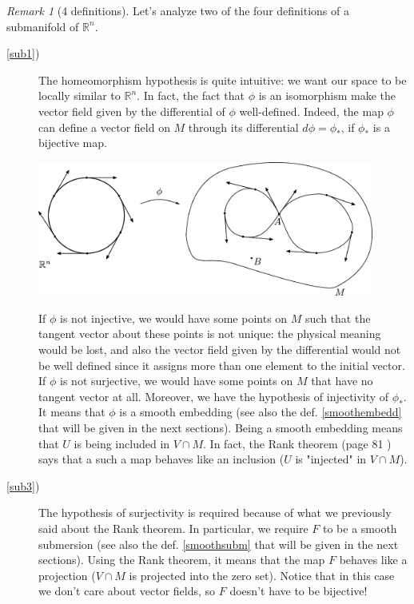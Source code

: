 \documentclass[a4paper,11pt,titlepage, article, oneside]{memoir}
\numberwithin{equation}{section}
\theoremstyle{definition}
\theoremstyle{remark}
\newtheorem{remark}[theorem]{Remark}
\newcommand{\rfield}{\mathbb{R}}
\begin{document}
\begin{remarkbox}\begin{remark}[4 definitions]
Let's analyze two of the four definitions of a submanifold of $\rfield^n$. 
\begin{description}
\item[\ref{sub1})] The homeomorphism hypothesis is quite intuitive: we want our space to be locally similar to $\rfield^n$. In fact, the fact that $\phi$ is an isomorphism make the vector field given by the differential of $\phi$ well-defined. Indeed, the map $\phi$ can define a vector field on $M$ through its differential $d\phi=\phi_*$, if $\phi_*$ is a bijective map. 
\begin{center}
\begin{minipage}{0.9\textwidth}
\vspace{1em}
     \centering
     \includegraphics[width=0.9\textwidth]{Images/notinjnotsurj.pdf} \label{Fig:notinjnotsurj}
     \vspace{1em}     
\end{minipage}
\end{center}
If $\phi$ is not injective, we would have some points on $M$ such that the tangent vector about these points is not unique: the physical meaning would be lost, and also the vector field given by the differential would not be well defined since it assigns more than one element to the initial vector. 
If $\phi$ is not surjective, we would have some points on $M$ that have no tangent vector at all. 
Moreover, we have the hypothesis of injectivity of $\phi_*$. It means that $\phi$ is a smooth embedding (see also the def. \ref{smoothembedd} that will be given in the next sections). Being a smooth embedding means that $U$ is being included in $V \cap M$. In fact, the Rank theorem (page 81 ) says that a such a map behaves like an inclusion ($U$ is "injected" in $V \cap M$).
\item[\ref{sub3})] The hypothesis of surjectivity is required because of what we previously said about the Rank theorem. In particular, we require $F$ to be a smooth submersion (see also the def. \ref{smoothsubm} that will be given in the next sections). Using the Rank theorem, it means that the map $F$ behaves like a projection ($V \cap M$ is projected into the zero set). Notice that in this case we don't care about vector fields, so $F$ doesn't have to be bijective!
\end{description}
\end{remark}\end{remarkbox}
\end{document}
